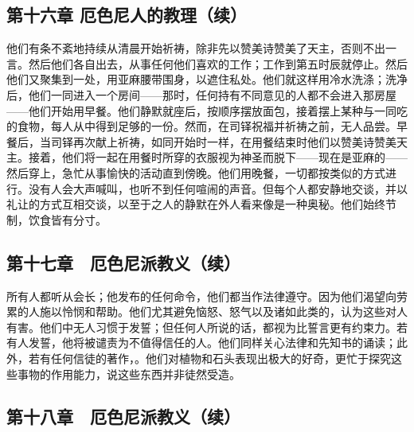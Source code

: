 
\subsection{第十六章 厄色尼人的教理（续）}

他们有条不紊地持续从清晨开始祈祷，除非先以赞美诗赞美了天主，否则不出一言。然后他们各自出去，从事任何他们喜欢的工作；工作到第五时辰就停止。然后他们又聚集到一处，用亚麻腰带围身，以遮住私处。他们就这样用冷水洗涤；洗净后，他们一同进入一个房间——那时，任何持有不同意见的人都不会进入那房屋——他们开始用早餐。他们静默就座后，按顺序摆放面包，接着摆上某种与一同吃的食物，每人从中得到足够的一份。然而，在司铎祝福并祈祷之前，无人品尝。早餐后，当司铎再次献上祈祷，如同开始时一样，在用餐结束时他们以赞美诗赞美天主。接着，他们将一起在用餐时所穿的衣服视为神圣而脱下——现在是亚麻的——然后穿上，急忙从事愉快的活动直到傍晚。他们用晚餐，一切都按类似的方式进行。没有人会大声喊叫，也听不到任何喧闹的声音。但每个人都安静地交谈，并以礼让的方式互相交谈，以至于之人的静默在外人看来像是一种奥秘。他们始终节制，饮食皆有分寸。\par


\subsection{第十七章　厄色尼派教义（续）}

所有人都听从会长；他发布的任何命令，他们都当作法律遵守。因为他们渴望向劳累的人施以怜悯和帮助。他们尤其避免恼怒、怒气以及诸如此类的，认为这些对人有害。他们中无人习惯于发誓；但任何人所说的话，都视为比誓言更有约束力。若有人发誓，他将被谴责为不值得信任的人。他们同样关心法律和先知书的诵读；此外，若有任何信徒的著作，。他们对植物和石头表现出极大的好奇，更忙于探究这些事物的作用能力，说这些东西并非徒然受造。\par


\subsection{第十八章　厄色尼派教义（续）}

